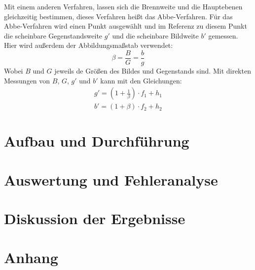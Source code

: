 \documentclass[11pt,a4paper]{article}
\begin{document}
Mit einem anderen Verfahren, lassen sich die Brennweite und die Hauptebenen gleichzeitig bestimmen, dieses Verfahren heißt das Abbe-Verfahren. Für das Abbe-Verfahren wird einen Punkt ausgewählt und im Referenz zu diesem Punkt die scheinbare Gegenstandsweite $g'$ und die scheinbare Bildweite $b'$ gemessen. Hier wird außerdem der Abbildungsmaßstab verwendet: 
$$ \beta = \frac{B}{G} = \frac{b}{g}$$
Wobei $B$ und $G$ jeweils de Größen des Bildes und Gegenstands sind. 
Mit direkten Messungen von $B$, $G$, $g'$ und $b'$ kann mit den Gleichungen:
\begin{equation}
\begin{array}{l}
	g' = (1+\frac{1}{\beta})\cdot f_1 + h_1 \\
	b' = (1+\beta)\cdot f_2 + h_2
\end{array}
\end{equation}



\section{Aufbau und Durchführung}



\section{Auswertung und Fehleranalyse}



\section{Diskussion der Ergebnisse}

\section{Anhang}
\end{document}
